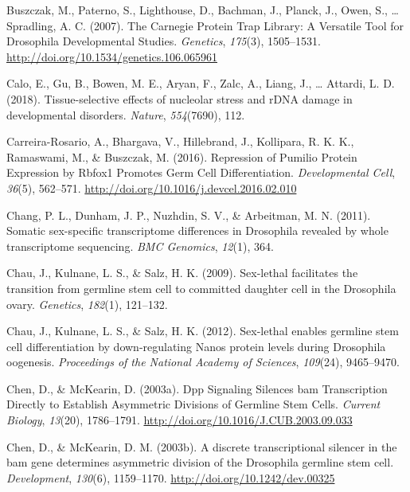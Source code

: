 \documentclass[12pt,twoside]{reedthesis}
\newlength{\cslhangindent}
\newenvironment{cslreferences}%
  {\setlength{\parindent}{0pt}%
  \everypar{\setlength{\hangindent}{\cslhangindent}}\ignorespaces}%
  {\par}
\begin{document}
\begin{cslreferences}
\leavevmode\hypertarget{ref-buszczakCarnegieProteinTrap2007}{}%
Buszczak, M., Paterno, S., Lighthouse, D., Bachman, J., Planck, J., Owen, S., \ldots{} Spradling, A. C. (2007). The Carnegie Protein Trap Library: A Versatile Tool for Drosophila Developmental Studies. \emph{Genetics}, \emph{175}(3), 1505--1531. \url{http://doi.org/10.1534/genetics.106.065961}

\leavevmode\hypertarget{ref-Calo2018a}{}%
Calo, E., Gu, B., Bowen, M. E., Aryan, F., Zalc, A., Liang, J., \ldots{} Attardi, L. D. (2018). Tissue-selective effects of nucleolar stress and rDNA damage in developmental disorders. \emph{Nature}, \emph{554}(7690), 112.

\leavevmode\hypertarget{ref-Carreira-Rosario2016e}{}%
Carreira-Rosario, A., Bhargava, V., Hillebrand, J., Kollipara, R. K. K., Ramaswami, M., \& Buszczak, M. (2016). Repression of Pumilio Protein Expression by Rbfox1 Promotes Germ Cell Differentiation. \emph{Developmental Cell}, \emph{36}(5), 562--571. \url{http://doi.org/10.1016/j.devcel.2016.02.010}

\leavevmode\hypertarget{ref-Chang2011}{}%
Chang, P. L., Dunham, J. P., Nuzhdin, S. V., \& Arbeitman, M. N. (2011). Somatic sex-specific transcriptome differences in Drosophila revealed by whole transcriptome sequencing. \emph{BMC Genomics}, \emph{12}(1), 364.

\leavevmode\hypertarget{ref-Chau2009}{}%
Chau, J., Kulnane, L. S., \& Salz, H. K. (2009). Sex-lethal facilitates the transition from germline stem cell to committed daughter cell in the Drosophila ovary. \emph{Genetics}, \emph{182}(1), 121--132.

\leavevmode\hypertarget{ref-Chau2012}{}%
Chau, J., Kulnane, L. S., \& Salz, H. K. (2012). Sex-lethal enables germline stem cell differentiation by down-regulating Nanos protein levels during Drosophila oogenesis. \emph{Proceedings of the National Academy of Sciences}, \emph{109}(24), 9465--9470.

\leavevmode\hypertarget{ref-Chen2003o}{}%
Chen, D., \& McKearin, D. (2003a). Dpp Signaling Silences bam Transcription Directly to Establish Asymmetric Divisions of Germline Stem Cells. \emph{Current Biology}, \emph{13}(20), 1786--1791. \url{http://doi.org/10.1016/J.CUB.2003.09.033}

\leavevmode\hypertarget{ref-Chen2003q}{}%
Chen, D., \& McKearin, D. M. (2003b). A discrete transcriptional silencer in the bam gene determines asymmetric division of the Drosophila germline stem cell. \emph{Development}, \emph{130}(6), 1159--1170. \url{http://doi.org/10.1242/dev.00325}


\end{cslreferences}
\end{document}
